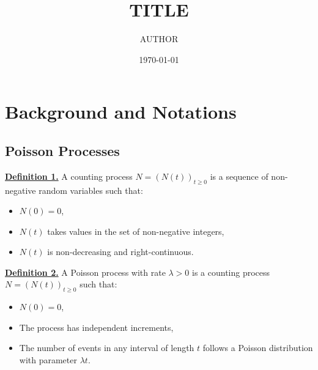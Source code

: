 \documentclass[a4paper, 12pt]{article}
\title{TITLE}
\author{AUTHOR}
\date{\today}
\newcommand{\bfu}[1]{\textbf{\underline{#1}}}
\begin{document}







\section{Background and Notations}
\subsection{Poisson Processes}

\bfu{Definition 1.} A counting process $N = (N(t))_{t \geq 0}$ is a sequence of non-negative random variables such that:
\begin{itemize}
    \item $N(0) = 0$,
    \item $N(t)$ takes values in the set of non-negative integers,
    \item $N(t)$ is non-decreasing and right-continuous.
\end{itemize}

\bfu{Definition 2.} A Poisson process with rate $\lambda > 0$ is a counting process $N = (N(t))_{t \geq 0}$ such that:
\begin{itemize}
    \item $N(0) = 0$,
    \item The process has independent increments,
    \item The number of events in any interval of length $t$ follows a Poisson distribution with parameter $\lambda t$.
\end{itemize}
\end{document}
